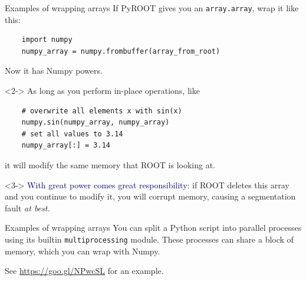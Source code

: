 \documentclass{beamer}
\begin{document}
\begin{frame}[fragile]{Examples of wrapping arrays}
\vspace{0.25 cm}
If PyROOT gives you an {\tt array.array}, wrap it like this:

\small
\begin{verbatim}
    import numpy
    numpy_array = numpy.frombuffer(array_from_root)
\end{verbatim}

\normalsize
Now it has Numpy powers.

\begin{uncoverenv}<2->
\vspace{0.25 cm}
As long as you perform in-place operations, like

\small
\begin{verbatim}
    # overwrite all elements x with sin(x)
    numpy.sin(numpy_array, numpy_array)
    # set all values to 3.14
    numpy_array[:] = 3.14
\end{verbatim}

\normalsize
it will modify the same memory that ROOT is looking at.
\end{uncoverenv}

\begin{uncoverenv}<3->
\vspace{0.25 cm}
\textcolor{darkblue}{With great power comes great responsibility:} if ROOT deletes this array and you continue to modify it, you will corrupt memory, causing a segmentation fault {\it at best.}
\end{uncoverenv}
\end{frame}

\begin{frame}[fragile]{Examples of wrapping arrays}
You can split a Python script into parallel processes using its builtin {\tt multiprocessing} module. These processes can share a block of memory, which you can wrap with Numpy.

\vspace{0.25 cm}
See \textcolor{blue}{\underline{\url{https://goo.gl/NPwcSL}}} for an example.
\end{frame}
\end{document}
